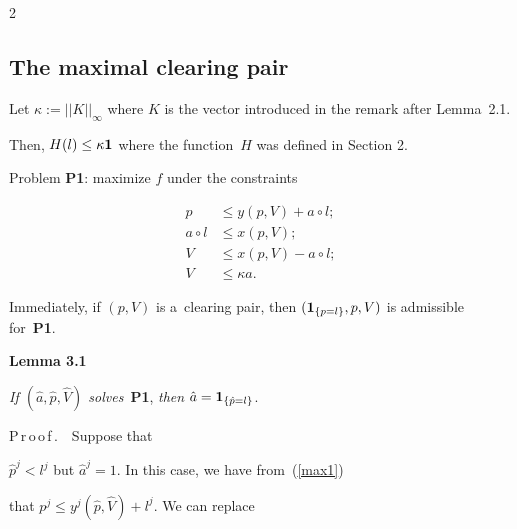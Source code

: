 \begin{multicols}{2}
\vspace*{-6pt}



\subsection{The maximal clearing pair}



\noindent

Let $\kappa:=||K||_\infty$ where $K$ is the vector introduced in the remark after Lemma~2.1. 

 Then, $H(l) \leq \kappa {\bf 1} $ where the function~$H$ was defined in Section 2. 



Problem {\bf P1}: maximize $f$ under the constraints 

\begin{align}

 \label{max1}

 p &\le y(p,V) + a \circ l; \\

 \label{max2}

 a \circ l &\le x(p,V); \\

\label{max3}

 V &\le x(p,V) - a \circ  l; \\

\label{max4}

 V &\leq \kappa a.

\end{align}

Immediately, if $(p, V)$ is a~clearing pair, then $({\bf 1}_{\{p = l\}}, p, V)$ is admissible for~{\bf P1}.



\smallskip



\noindent

\textbf{Lemma 3.1}\

\textit{If $(\hat a, \hat p, \hat V)$ solves}~\textbf{P1}, \textit{then} $\hat a = {\bf 1}_{\{\hat p = l\}}$.





\smallskip

\noindent

P\,r\,o\,o\,f\,.\ \  Suppose that 

 $\hat p^j < l^j$ but $\hat a^j=1$. In this case, we have from~(\ref{max1}) 

 that   $p^j\le y^j(\hat p,\hat V) + l^j $. We can replace  


\end{multicols}
